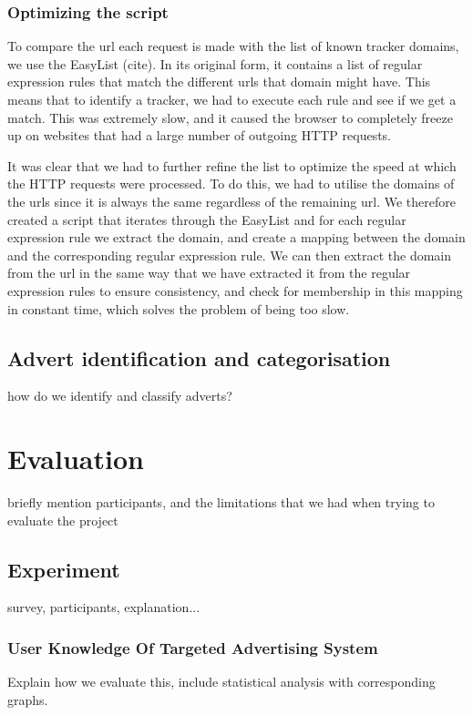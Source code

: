 \documentclass{l4proj}
\begin{document}
\subsection{Optimizing the script}
To compare the url each request is made with the list of known tracker domains, we use the EasyList (cite). In its original form, it contains a list of regular expression rules that match the different urls that domain might have. This means that to identify a tracker, we had to execute each rule and see if we get a match. This was extremely slow, and it caused the browser to completely freeze up on websites that had a large number of outgoing HTTP requests.

It was clear that we had to further refine the list to optimize the speed at which the HTTP requests were processed. To do this, we had to utilise the domains of the urls since it is always the same regardless of the remaining url. We therefore created a script that iterates through the EasyList and for each regular expression rule we extract the domain, and create a mapping between the domain and the corresponding regular expression rule. We can then extract the domain from the url in the same way that we have extracted it from the regular expression rules to ensure consistency, and check for membership in this mapping in constant time, which solves the problem of being too slow.

\section{Advert identification and categorisation}
how do we identify and classify adverts?

\chapter{Evaluation} 
briefly mention participants, and the limitations that we had when trying to evaluate the project

\section{Experiment}
survey, participants, explanation...

\subsection{User Knowledge Of Targeted Advertising System}
Explain how we evaluate this, include statistical analysis with corresponding graphs.
\end{document}
